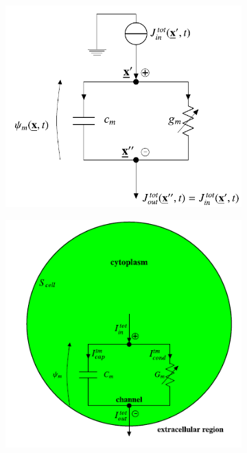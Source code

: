 \documentclass[a4paper]{article}
\begin{document}
	\begin{figure}[H]
		\begin{minipage}{\linewidth}
			\centering
			\begin{minipage}{0.45\linewidth}
				\begin{figure}[H]
					\includegraphics[width=\linewidth]{ode_circuit.png}
					
				\end{figure}
			\end{minipage}
			\hspace{0.05\linewidth}
			\begin{minipage}{0.48\linewidth}
				\begin{figure}[H]
					\includegraphics[width=\linewidth]{global_circuit.png}
					

\end{figure}
\end{minipage}
\end{minipage}
\end{figure}
\end{document}
